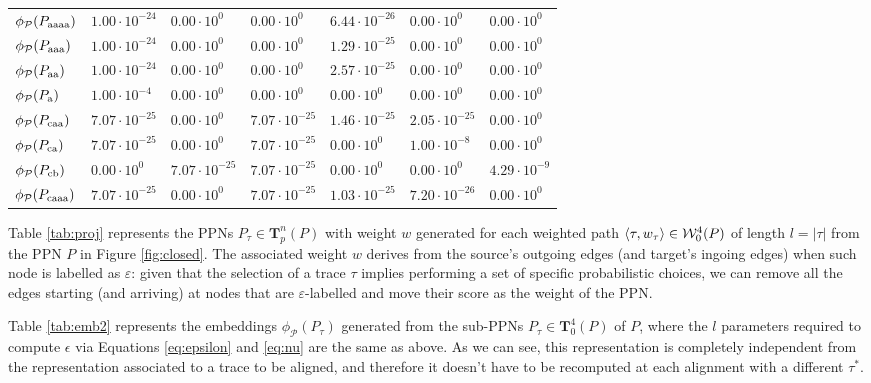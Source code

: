 \begin{table}[!t]
\begin{tabular}{l|l|l|l|l|l|l|}
		
		$\phi_{\mathcal{P}}(P_\textup{aaaa})$ & $1.00\cdot 10^{-24}$ & $0.00\cdot 10^{0}$ & $0.00\cdot 10^{0}$& $6.44\cdot 10^{-26}$& $0.00\cdot 10^{0}$& $0.00\cdot 10^{0}$\\
		$\phi_{\mathcal{P}}(P_\textup{aaa})$ & $1.00\cdot 10^{-24}$ & $0.00\cdot 10^{0}$ & $0.00\cdot 10^{0}$& $1.29\cdot 10^{-25}$& $0.00\cdot 10^{0}$& $0.00\cdot 10^{0}$\\
		$\phi_{\mathcal{P}}(P_\textup{aa})$ & $1.00\cdot 10^{-24}$ & $0.00\cdot 10^{0}$ & $0.00\cdot 10^{0}$& $2.57\cdot 10^{-25}$& $0.00\cdot 10^{0}$& $0.00\cdot 10^{0}$\\
		$\phi_{\mathcal{P}}(P_\textup{a})$ & $1.00\cdot 10^{-4}$ & $0.00\cdot 10^{0}$ & $0.00\cdot 10^{0}$& $0.00\cdot 10^{0}$& $0.00\cdot 10^{0}$& $0.00\cdot 10^{0}$\\
		$\phi_{\mathcal{P}}(P_\textup{caa})$ & $7.07\cdot 10^{-25}$ & $0.00\cdot 10^{0}$ & $7.07\cdot 10^{-25}$& $1.46\cdot 10^{-25}$& $2.05\cdot 10^{-25}$& $0.00\cdot 10^{0}$\\
		$\phi_{\mathcal{P}}(P_\textup{ca})$ & $7.07\cdot 10^{-25}$ & $0.00\cdot 10^{0}$ & $7.07\cdot 10^{-25}$& $0.00\cdot 10^{0}$& $1.00\cdot 10^{-8}$& $0.00\cdot 10^{0}$\\
		$\phi_{\mathcal{P}}(P_\textup{cb})$ &  $0.00\cdot 10^{0}$ & $7.07\cdot 10^{-25}$ & $7.07\cdot 10^{-25}$& $0.00\cdot 10^{0}$&  $0.00\cdot 10^{0}$ & $4.29\cdot 10^{-9}$\\
		$\phi_{\mathcal{P}}(P_\textup{caaa})$  & $7.07\cdot 10^{-25}$ &  $0.00\cdot 10^{0}$ & $7.07\cdot 10^{-25}$& $1.03\cdot 10^{-25}$&  $7.20\cdot 10^{-26}$ & $0.00\cdot 10^{0}$\\
		\bottomrule
	\end{tabular}
\end{table}
\begin{example}\label{ex:explainembed}
	Table \ref{tab:proj} represents the PPNs $P_\tau\in\mathbf{T}_p^n(P)$ with weight $w$ generated for each weighted path $\braket{\tau,w_\tau}\in \mathcal{W}_0^4(P)$ of length $l=|\tau|$ from the PPN $P$ in Figure \ref{fig:closed}. The associated weight $w$ derives from the source's outgoing edges (and target's ingoing edges) when such node is  labelled as $\varepsilon$: given that the selection of a trace $\tau$ implies performing a set of specific probabilistic choices, we can remove all the edges starting (and arriving) at nodes that are $\varepsilon$-labelled and move their score as the weight of the PPN. 
	
	Table \ref{tab:emb2} represents the embeddings $\phi_{\mathcal{P}}(P_\tau)$ generated from the sub-PPNs $P_\tau\in \mathbf{T}_0^4(P)$ of $P$, where the $l$ parameters required to compute $\epsilon$ via Equations \ref{eq:epsilon} and \ref{eq:nu} are the same as above. As we can see, this representation is completely independent from the representation associated to a trace to be aligned, and therefore it doesn't have to be recomputed at each alignment with a different $\tau^*$.
\end{example}



